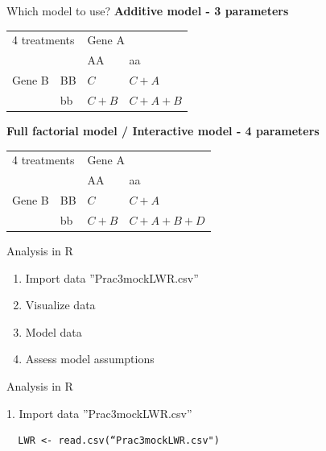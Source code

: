 \documentclass[10pt]{beamer}
\makeatletter
\newenvironment{kframe}{%
 \def\at@end@of@kframe{}%
 \ifinner\ifhmode%
  \def\at@end@of@kframe{\end{minipage}}%
  \begin{minipage}{\columnwidth}%
 \fi\fi%
 \def\FrameCommand##1{\hskip\@totalleftmargin \hskip-\fboxsep
 \colorbox{shadecolor}{##1}\hskip-\fboxsep
     \hskip-\linewidth \hskip-\@totalleftmargin \hskip\columnwidth}%
 \MakeFramed {\advance\hsize-\width
   \@totalleftmargin\z@ \linewidth\hsize
   \@setminipage}}%
 {\par\unskip\endMakeFramed%
 \at@end@of@kframe}
\newenvironment{knitrout}{}{} %
\makeatother
\begin{document}
\begin{frame}{Which model to use?}
 \textbf{Additive model - 3 parameters}
\begin{center}
\begin{tabular}{|l | l | l | l | }
\toprule
  \multicolumn{2}{|l|}{4 treatments} & \multicolumn{2}{l|}{Gene A}\\
  \cmidrule(lr){3-4}
  \multicolumn{2}{|l|}{}  & AA & aa\\
 	    \midrule
      Gene B & BB & $C$ & $C+A$\\
      \cmidrule(lr){3-4}
 	    & bb & $C+B$ & $C+A+B$\\
	    \bottomrule
  \end{tabular}
\end{center}
 

\textbf{Full factorial model / Interactive model - 4 parameters }
\begin{center}
\begin{tabular}{|l | l | l | l | }
\toprule
  \multicolumn{2}{|l|}{4 treatments} & \multicolumn{2}{l|}{Gene A}\\
  \cmidrule(lr){3-4}
  \multicolumn{2}{|l|}{}  & AA & aa\\
 	    \midrule
      Gene B & BB & $C$ & $C+A$\\
      \cmidrule(lr){3-4}
 	    & bb & $C+B$ & $C+A+B+D$\\
	    \bottomrule
  \end{tabular}
\end{center}
\end{frame}

\begin{frame}{Analysis in R}
 
 \begin{enumerate}
  \item Import data ''Prac3mockLWR.csv''
  \item Visualize data
  \item Model data
  \item Assess model assumptions
 \end{enumerate}

\end{frame}

\begin{frame}[fragile]{Analysis in R}
 
 1. Import data ''Prac3mockLWR.csv''
 
 \begin{knitrout}
\color{fgcolor}\begin{kframe}
\begin{verbatim}
  LWR <- read.csv(“Prac3mockLWR.csv")
 \end{verbatim}
\end{kframe}
\end{knitrout}
 
\end{frame}
\end{document}
